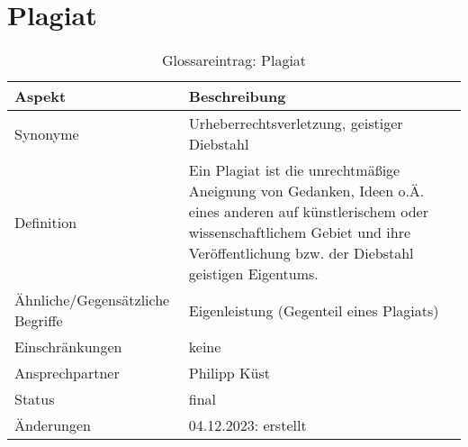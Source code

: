 \section*{Plagiat}\label{sec:glossar_plagiat}
\begin{table}[H]
    \label{tab:glossar_plagiat}
    \begin{tabularx}{\textwidth}{|l|X|}
        \hline
        \textbf{Aspekt}                  & \textbf{Beschreibung}                                                                                                                                                                                  \\
        \hline
        Synonyme                         & Urheberrechtsverletzung, geistiger Diebstahl                                                                                                                                                           \\
        \hline
        Definition                       & Ein Plagiat ist die unrechtmäßige Aneignung von Gedanken, Ideen o.Ä. eines anderen auf künstlerischem oder wissenschaftlichem Gebiet und ihre Veröffentlichung bzw. der Diebstahl geistigen Eigentums. \\
        \hline
        Ähnliche/Gegensätzliche Begriffe & Eigenleistung (Gegenteil eines Plagiats)                                                                                                                                                               \\
        \hline
        Einschränkungen                  & keine                                                                                                                                                                                                  \\
        \hline
        Ansprechpartner                  & Philipp Küst                                                                                                                                                                                           \\
        \hline
        Status                           & final                                                                                                                                                                                                  \\
        \hline
        Änderungen                       & 04.12.2023: erstellt                                                                                                                                                                                   \\
        \hline
    \end{tabularx}
    \caption{Glossareintrag: Plagiat}
\end{table}


